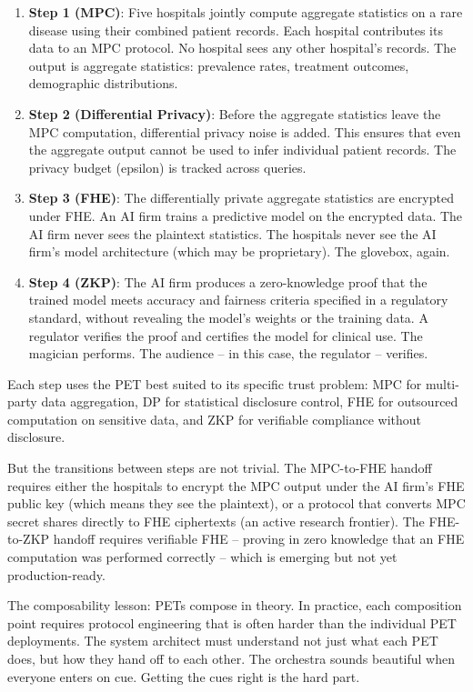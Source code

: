 \documentclass[
  11pt,
  openany]{report}
\renewcommand{\textbf}[1]{{\bfseries\color{MidnightBold}#1}}
\begin{document}
\begin{enumerate}
\def\labelenumi{\arabic{enumi}.}
\item
  \textbf{Step 1 (MPC)}: Five hospitals jointly compute aggregate statistics on
  a rare disease using their combined patient records. Each hospital contributes
  its data to an MPC protocol. No hospital sees any other hospital's records.
  The output is aggregate statistics: prevalence rates, treatment outcomes,
  demographic distributions.
\item
  \textbf{Step 2 (Differential Privacy)}: Before the aggregate statistics leave
  the MPC computation, differential privacy noise is added. This ensures that
  even the aggregate output cannot be used to infer individual patient records.
  The privacy budget (epsilon) is tracked across queries.
\item
  \textbf{Step 3 (FHE)}: The differentially private aggregate statistics are
  encrypted under FHE. An AI firm trains a predictive model on the encrypted
  data. The AI firm never sees the plaintext statistics. The hospitals never see
  the AI firm's model architecture (which may be proprietary). The glovebox,
  again.
\item
  \textbf{Step 4 (ZKP)}: The AI firm produces a zero-knowledge proof that the
  trained model meets accuracy and fairness criteria specified in a regulatory
  standard, without revealing the model's weights or the training data. A
  regulator verifies the proof and certifies the model for clinical use. The
  magician performs. The audience -- in this case, the regulator -- verifies.
\end{enumerate}

Each step uses the PET best suited to its specific trust problem: MPC for
multi-party data aggregation, DP for statistical disclosure control, FHE for
outsourced computation on sensitive data, and ZKP for verifiable compliance
without disclosure.

But the transitions between steps are not trivial. The MPC-to-FHE handoff
requires either the hospitals to encrypt the MPC output under the AI firm's FHE
public key (which means they see the plaintext), or a protocol that converts MPC
secret shares directly to FHE ciphertexts (an active research frontier). The
FHE-to-ZKP handoff requires verifiable FHE -- proving in zero knowledge that an
FHE computation was performed correctly -- which is emerging but not yet
production-ready.

The composability lesson: PETs compose in theory. In practice, each composition
point requires protocol engineering that is often harder than the individual PET
deployments. The system architect must understand not just what each PET does,
but how they hand off to each other. The orchestra sounds beautiful when
everyone enters on cue. Getting the cues right is the hard part.
\end{document}
